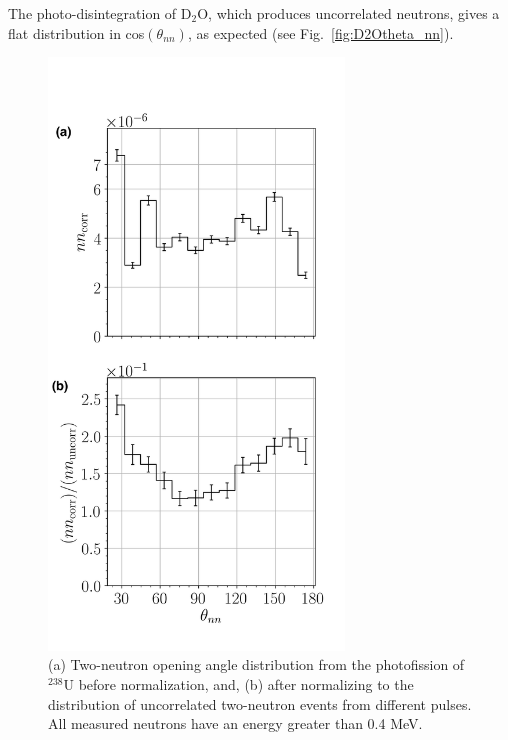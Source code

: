 The photo-disintegration of D$_{2}$O, which produces uncorrelated neutrons, gives a flat distribution in cos$(\theta_{nn})$, as expected (see Fig.~\ref{fig:D2Otheta_nn}).
\begin{figure}[]
\centering
    \includegraphics[width=0.7\textwidth]{Content/Methods/SPDPNormalization.png}
    \caption{(a) Two-neutron opening angle distribution from the photofission of $^{238}$U before normalization, and, (b) after normalizing to the distribution of uncorrelated two-neutron events from different pulses.
    All measured neutrons have an energy greater than 0.4 MeV.}
    \label{fig:SPDPNormalization}
\end{figure}
